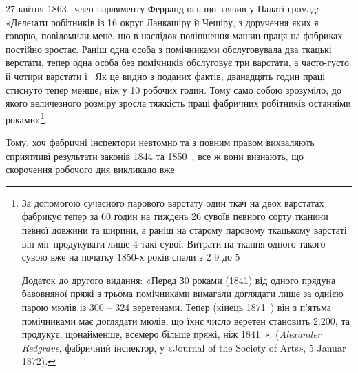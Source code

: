 27 квітня 1863~ член парляменту Ферранд ось що заявив у
Палаті громад: «Делеґати робітників із 16 округ Ланкашіру й
Чешіру, з доручення яких я говорю, повідомили мене, що в наслідок
поліпшення машин праця на фабриках постійно зростає.
Раніш одна особа з помічниками обслуговувала два ткацькі верстати,
тепер одна особа без помічників обслуговує три варстати,
а часто-густо й чотири варстати і~ Як це видно з поданих
фактів, дванадцять годин праці стиснуто тепер менше, ніж у
10 робочих годин. Тому само собою зрозуміло, до якого величезного
розміру зросла тяжкість праці фабричних робітників останніми
роками»\footnote{
За допомогою сучасного парового варстату один ткач на двох
варстатах фабрикує тепер за 60 годин на тиждень 26 сувоїв певного сорту
тканини певної довжини та ширини, а раніш на старому паровому ткацькому
варстаті він міг продукувати лише 4 такі сувої. Витрати на ткання
одного такого сувою вже на початку 1850-х років спали з 2
9 до 5

Додаток до другого видання: «Перед З0 роками (1841) від одного прядуна
бавовняної пряжі з трьома помічниками вимагали доглядати лише
за однією парою мюлів із 300 – 324 веретенами. Тепер (кінець 1871~)
він з п’ятьма помічниками має доглядати мюлів, що їхнє число веретен
становить \num{2.200}, та продукує, щонайменше, всемеро більше пряжі, ніж
1841~». (\emph{Alexander Redgrave}, фабричний інспектор, у «Journal of
the Society of Arts», 5 Januar 1872).
}.

Тому, хоч фабричні інспектори невтомно та з повним правом
вихваляють сприятливі результати законів 1844 та 1850~,
все ж вони визнають, що скорочення робочого дня викликало вже
\parbreak{}  %
